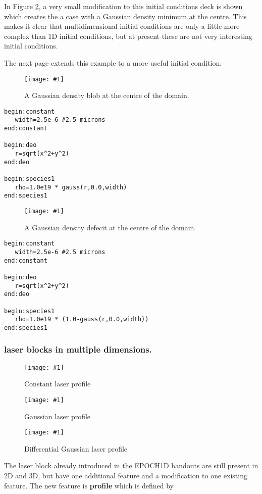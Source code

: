 \documentclass[12pt]{article}
\newcommand{\boxverbatim}[1]{\begin{Verbatim}[obeytabs=true,frame=single,
  framerule=0.5mm,rulecolor=\color{warwickmid},label=#1]}
\newcommand{\inlineemph}[1]{{\color{warwicklight} \bf{#1}}}
\newcommand{\scaledcapimage}[4]
  {{\begin{figure}\centering \texttt{[image: \#1]} \caption{#3}
    \label{#2} \end{figure}}}
\begin{document}
In Figure \ref{inversegaussblob}, a very small modification to this initial
conditions deck is shown which creates the a case with a Gaussian density
minimum at the centre. This makes it clear that multidimensional initial
conditions are only a little more complex than 1D initial conditions, but at
present these are not very interesting initial conditions.

The next page extends this example to a more useful initial condition. \\

\scaledcapimage{./images/gaussic.eps}{gaussblob}{A Gaussian density blob at the
centre of the domain.}{0.4}

\boxverbatim{species block to set up Gaussian density blob}
begin:constant
   width=2.5e-6 #2.5 microns
end:constant

begin:deo
   r=sqrt(x^2+y^2)
end:deo

begin:species1
   rho=1.0e19 * gauss(r,0.0,width)
end:species1
\end{Verbatim}

\scaledcapimage{./images/invgaussic.eps}{inversegaussblob}{A Gaussian density
defecit at the centre of the domain.}{0.4}

\begin{minipage}{\textwidth}
\boxverbatim{species block to set up Gaussian density blob}
begin:constant
   width=2.5e-6 #2.5 microns
end:constant

begin:deo
   r=sqrt(x^2+y^2)
end:deo

begin:species1
   rho=1.0e19 * (1.0-gauss(r,0.0,width))
end:species1
\end{Verbatim}
\end{minipage}

\subsubsection{\inlineemph{laser} blocks in multiple dimensions.}

\scaledcapimage{./images/profile_flat.eps}{flatlaser}{Constant laser
profile}{0.4} \scaledcapimage{./images/profile_gauss.eps}{gausslaser}{Gaussian
laser profile}{0.4}
\scaledcapimage{./images/profile_diff_gauss.eps}{diffgausslaser}{Differential
Gaussian laser profile}{0.4}

The laser block already introduced in the EPOCH1D handouts are still present in
2D and 3D, but have one additional feature and a modification to one existing
feature. The new feature is \inlineemph{profile} which is defined
by\\
\end{document}
